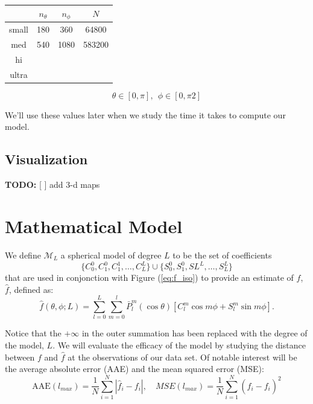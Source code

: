 \documentclass[a4paper]{article}
\theoremstyle{definition}
\begin{document}
    \begin{center}
    \begin{tabular}{ c |  c  c  c }
        & $n_\theta$ & $n_\phi$ & $N$ \\ 
    \hline
    small & 180 & 360 & 64800\\
    med & 540 & 1080 & 583200\\
    hi \\
    ultra
    \end{tabular}
    \end{center}
$$\theta \in [0, \pi],\ \ \phi \in [0, \pi2]$$

We'll use these values later when we study the time it takes to compute our model.

\subsection{Visualization}

\textbf{TODO:} [ ] add 3-d maps

\section{Mathematical Model}

We define $\mathcal{M}_L$ a spherical model of degree $L$ to be the set of coefficients $$\{C_0^0, C_1^0, C_1^1, \dots, C_L^L\} \cup \{S_0^0, S_1^0, SL^L, \dots, S_L^L\}$$
 that are used in conjonction with Figure (\ref{eq:f_iso}) to provide an estimate of $f$, $\hat f$, defined as:
\begin{equation}
    \hat f(\theta, \phi; L) = \sum_{l = 0}^{L}\sum_{m = 0}^l \bar P_l^m(\cos\theta)[C_l^m\cos m\phi + S_l^m \sin m \phi].
\end{equation}

Notice that the $+\infty$ in the outer summation has been replaced with the degree of the model, $L$. We will evaluate the efficacy of the model by studying the distance between $f$ and $\hat f$
at the observations of our data set. Of notable interest will be the average absolute error (AAE) and the mean squared error (MSE):
\begin{equation}
    \label{eq:AAE}
    \mathrm{AAE}(l_{max}) = \frac{1}{N}\sum_{i = 1}^{N} |\hat f_i - f_i |, \quad MSE(l_{max}) = \frac{1}{N} \sum_{i = 1}^N (\hat f_i - f_i)^2
\end{equation}
\end{document}
